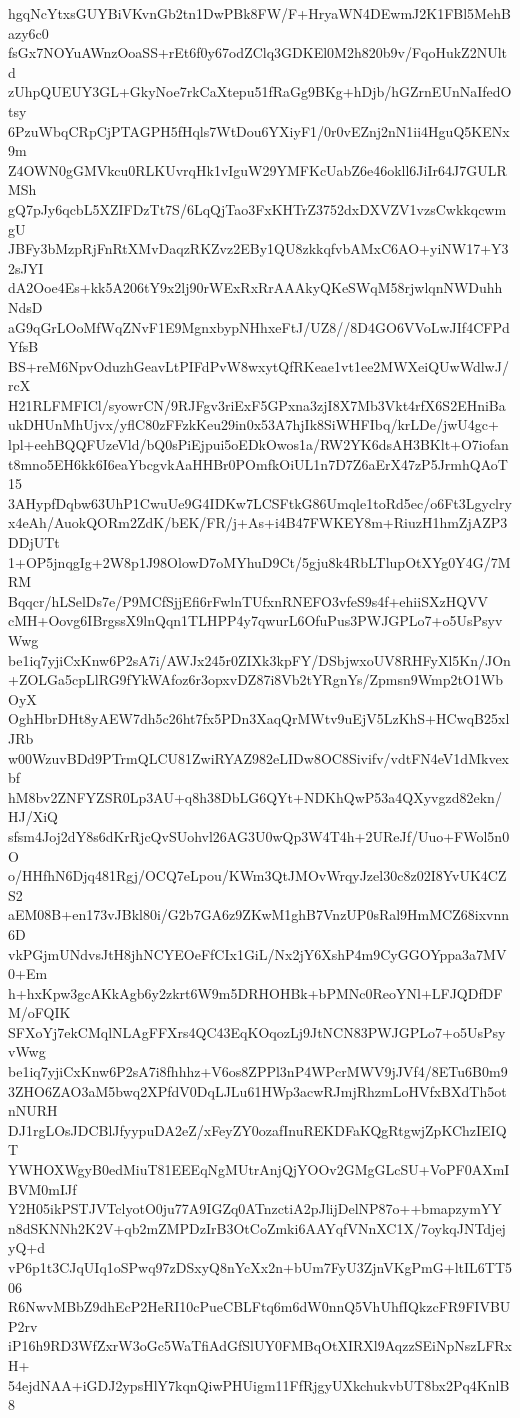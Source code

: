 hgqNcYtxsGUYBiVKvnGb2tn1DwPBk8FW/F+HryaWN4DEwmJ2K1FBl5MehBazy6c0
fsGx7NOYuAWnzOoaSS+rEt6f0y67odZClq3GDKEl0M2h820b9v/FqoHukZ2NUltd
zUhpQUEUY3GL+GkyNoe7rkCaXtepu51fRaGg9BKg+hDjb/hGZrnEUnNaIfedOtsy
6PzuWbqCRpCjPTAGPH5fHqls7WtDou6YXiyF1/0r0vEZnj2nN1ii4HguQ5KENx9m
Z4OWN0gGMVkcu0RLKUvrqHk1vIguW29YMFKcUabZ6e46okll6JiIr64J7GULRMSh
gQ7pJy6qcbL5XZIFDzTt7S/6LqQjTao3FxKHTrZ3752dxDXVZV1vzsCwkkqcwmgU
JBFy3bMzpRjFnRtXMvDaqzRKZvz2EBy1QU8zkkqfvbAMxC6AO+yiNW17+Y32sJYI
dA2Ooe4Es+kk5A206tY9x2lj90rWExRxRrAAAkyQKeSWqM58rjwlqnNWDuhhNdsD
aG9qGrLOoMfWqZNvF1E9MgnxbypNHhxeFtJ/UZ8//8D4GO6VVoLwJIf4CFPdYfsB
BS+reM6NpvOduzhGeavLtPIFdPvW8wxytQfRKeae1vt1ee2MWXeiQUwWdlwJ/rcX
H21RLFMFICl/syowrCN/9RJFgv3riExF5GPxna3zjI8X7Mb3Vkt4rfX6S2EHniBa
ukDHUnMhUjvx/yflC80zFFzkKeu29in0x53A7hjIk8SiWHFIbq/krLDe/jwU4gc+
lpl+eehBQQFUzeVld/bQ0sPiEjpui5oEDkOwos1a/RW2YK6dsAH3BKlt+O7iofan
t8mno5EH6kk6I6eaYbcgvkAaHHBr0POmfkOiUL1n7D7Z6aErX47zP5JrmhQAoT15
3AHypfDqbw63UhP1CwuUe9G4IDKw7LCSFtkG86Umqle1toRd5ec/o6Ft3Lgyclry
x4eAh/AuokQORm2ZdK/bEK/FR/j+As+i4B47FWKEY8m+RiuzH1hmZjAZP3DDjUTt
1+OP5jnqgIg+2W8p1J98OlowD7oMYhuD9Ct/5gju8k4RbLTlupOtXYg0Y4G/7MRM
Bqqcr/hLSelDs7e/P9MCfSjjEfi6rFwlnTUfxnRNEFO3vfeS9s4f+ehiiSXzHQVV
cMH+Oovg6IBrgssX9lnQqn1TLHPP4y7qwurL6OfuPus3PWJGPLo7+o5UsPsyvWwg
be1iq7yjiCxKnw6P2sA7i/AWJx245r0ZIXk3kpFY/DSbjwxoUV8RHFyXl5Kn/JOn
+ZOLGa5cpLlRG9fYkWAfoz6r3opxvDZ87i8Vb2tYRgnYs/Zpmsn9Wmp2tO1WbOyX
OghHbrDHt8yAEW7dh5c26ht7fx5PDn3XaqQrMWtv9uEjV5LzKhS+HCwqB25xlJRb
w00WzuvBDd9PTrmQLCU81ZwiRYAZ982eLIDw8OC8Sivifv/vdtFN4eV1dMkvexbf
hM8bv2ZNFYZSR0Lp3AU+q8h38DbLG6QYt+NDKhQwP53a4QXyvgzd82ekn/HJ/XiQ
sfsm4Joj2dY8s6dKrRjcQvSUohvl26AG3U0wQp3W4T4h+2UReJf/Uuo+FWol5n0O
o/HHfhN6Djq481Rgj/OCQ7eLpou/KWm3QtJMOvWrqyJzel30c8z02I8YvUK4CZS2
aEM08B+en173vJBkl80i/G2b7GA6z9ZKwM1ghB7VnzUP0sRal9HmMCZ68ixvnn6D
vkPGjmUNdvsJtH8jhNCYEOeFfCIx1GiL/Nx2jY6XshP4m9CyGGOYppa3a7MV0+Em
h+hxKpw3gcAKkAgb6y2zkrt6W9m5DRHOHBk+bPMNc0ReoYNl+LFJQDfDFM/oFQIK
SFXoYj7ekCMqlNLAgFFXrs4QC43EqKOqozLj9JtNCN83PWJGPLo7+o5UsPsyvWwg
be1iq7yjiCxKnw6P2sA7i8fhhhz+V6os8ZPPl3nP4WPcrMWV9jJVf4/8ETu6B0m9
3ZHO6ZAO3aM5bwq2XPfdV0DqLJLu61HWp3acwRJmjRhzmLoHVfxBXdTh5otnNURH
DJ1rgLOsJDCBlJfyypuDA2eZ/xFeyZY0ozafInuREKDFaKQgRtgwjZpKChzIEIQT
YWHOXWgyB0edMiuT81EEEqNgMUtrAnjQjYOOv2GMgGLcSU+VoPF0AXmIBVM0mIJf
Y2H05ikPSTJVTclyotO0ju77A9IGZq0ATnzctiA2pJlijDelNP87o++bmapzymYY
n8dSKNNh2K2V+qb2mZMPDzIrB3OtCoZmki6AAYqfVNnXC1X/7oykqJNTdjejyQ+d
vP6p1t3CJqUIq1oSPwq97zDSxyQ8nYcXx2n+bUm7FyU3ZjnVKgPmG+ltIL6TT506
R6NwvMBbZ9dhEcP2HeRI10cPueCBLFtq6m6dW0nnQ5VhUhfIQkzcFR9FIVBUP2rv
iP16h9RD3WfZxrW3oGc5WaTfiAdGfSlUY0FMBqOtXIRXl9AqzzSEiNpNszLFRxH+
54ejdNAA+iGDJ2ypsHlY7kqnQiwPHUigm11FfRjgyUXkchukvbUT8bx2Pq4KnlB8

